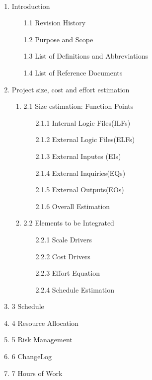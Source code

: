 \documentclass{article}
\begin{document}
 \\    %
\begin{enumerate}

\item Introduction




\begin {enumerate}
\item [1.1] Revision History
\item [1.2] Purpose and Scope
\item [1.3] List of Definitions and Abbreviations 
\item [1.4] List of Reference Documents

\end{enumerate}

\item Project size, cost and effort estimation


\begin {enumerate}
\item [2.1] Size estimation: Function Points

\begin{enumerate}
\item[2.1.1]{Internal Logic Files(ILFs)}
\item[2.1.2]{External Logic Files(ELFs)}
\item[2.1.3]{External Inputes (EIs)}
\item[2.1.4]{External Inquiries(EQs)}
\item[2.1.5]{External Outputs(EOs)}
\item[2.1.6]{Overall Estimation}
\end{enumerate}
\item [2.2] Elements to be Integrated 
\begin{enumerate}
\item[2.2.1]{Scale Drivers}
\item[2.2.2]{Cost Drivers}
\item[2.2.3]{Effort Equation}
\item[2.2.4]{Schedule Estimation}

\end{enumerate}



\end {enumerate} 




\item[3] Schedule



\item[4] Resource Allocation



\item[5] Risk Management 



\item [6]ChangeLog
\item[7] Hours of Work


\end{enumerate}
\end{document}
